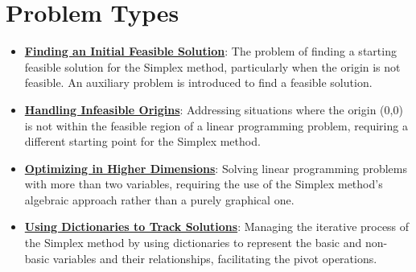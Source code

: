 \documentclass{article}%
\begin{document}
%
\section{Problem Types}%
\label{sec:ProblemTypes}%
\begin{itemize}[[leftmargin=*]]%
\item \href{https://www.math.purdue.edu/~yipn/421/2024-08-27-ExSimplex.pdf#page=32}{\textbf{Finding an Initial Feasible Solution}}: The problem of finding a starting feasible solution for the Simplex method, particularly when the origin is not feasible. An auxiliary problem is introduced to find a feasible solution. %
\item \href{https://www.math.purdue.edu/~yipn/421/2024-08-27-ExSimplex.pdf#page=30}{\textbf{Handling Infeasible Origins}}: Addressing situations where the origin (0,0) is not within the feasible region of a linear programming problem, requiring a different starting point for the Simplex method. %
\item \href{https://www.math.purdue.edu/~yipn/421/2024-08-27-ExSimplex.pdf#page=17}{\textbf{Optimizing in Higher Dimensions}}: Solving linear programming problems with more than two variables, requiring the use of the Simplex method's algebraic approach rather than a purely graphical one. %
\item \href{https://www.math.purdue.edu/~yipn/421/2024-08-27-ExSimplex.pdf#page=26}{\textbf{Using Dictionaries to Track Solutions}}: Managing the iterative process of the Simplex method by using dictionaries to represent the basic and non-basic variables and their relationships, facilitating the pivot operations. %
\end{itemize}

%
\end{document}
